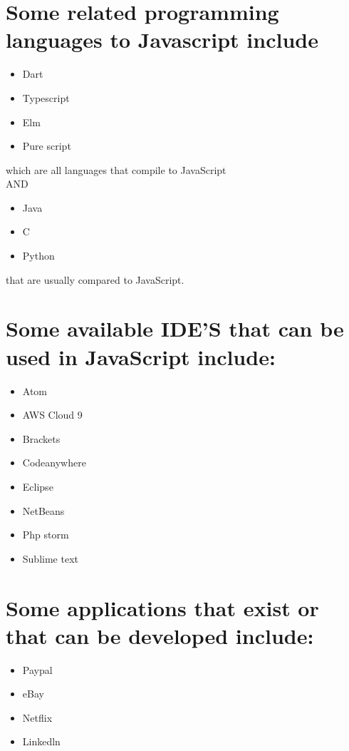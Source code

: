 \documentclass{article}
\begin{document}
	\section{Some related programming languages to Javascript include}
	\begin{itemize}
		\item Dart
		\item Typescript
		\item Elm
		\item Pure script
	\end{itemize}
		which are all languages that compile to JavaScript\\ AND
		\begin{itemize}
		\item Java
		\item C
		\item Python 
			\end{itemize}
		that are usually compared to JavaScript.
		\section{Some available IDE'S that can be used in JavaScript include:}
		\begin{itemize}
			\item Atom
			\item AWS Cloud 9
			\item Brackets
			\item Codeanywhere
			\item Eclipse
			\item NetBeans
			\item 	Php storm
			\item Sublime text
		\end{itemize}
	\section{Some applications that exist or that can be developed include:}
	\begin{itemize}
		\item Paypal
		\item eBay
		\item Netflix
		\item Linkedln
	\end{itemize}
\end{document}
